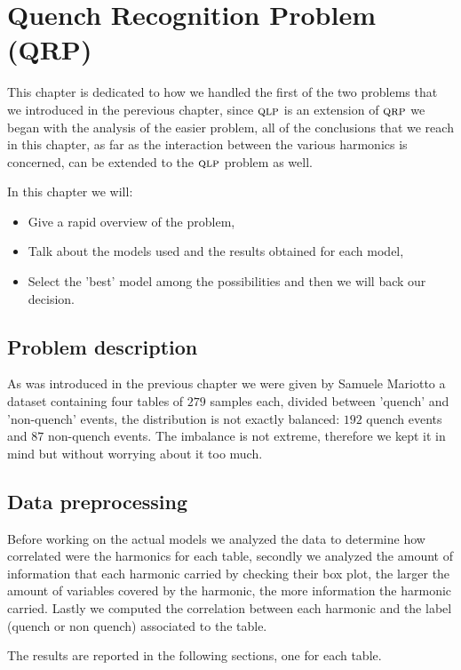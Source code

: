 \chapter{Quench Recognition Problem (QRP)}
\label{chp:qrp}
This chapter is dedicated to how we handled the first of the two problems that we introduced in the
perevious chapter, since $\textsc{qlp}$ is an extension of $\textsc{qrp}$ we began with the analysis of the easier
problem, all of the conclusions that we reach in this chapter, as far as the interaction between the
various harmonics is concerned, can be extended to the $\textsc{qlp}$ problem as well.

In this chapter we will:
\begin{itemize}
	\item Give a rapid overview of the problem,
	\item Talk about the models used and the results obtained for each model,
	\item Select the 'best' model among the possibilities and then we will back our decision.
\end{itemize}

\section{Problem description}
As was introduced in the previous chapter we were given by Samuele Mariotto a dataset containing
four tables of $279$ samples each, divided between 'quench' and 'non-quench' events, the distribution is not exactly
balanced: $192$ quench events and $87$ non-quench events. The imbalance is not
extreme, therefore we kept it in mind but without worrying about it too much.

\section{Data preprocessing}
Before working on the actual models we analyzed the data to determine how correlated were the
harmonics for each table, secondly we analyzed the amount of information that each harmonic carried
by checking their box plot, the larger the amount of variables covered by the harmonic, the more
information the harmonic carried. Lastly we computed the correlation between each harmonic and the
label (quench or non quench) associated to the table.

The results are reported in the following sections, one for each table.

